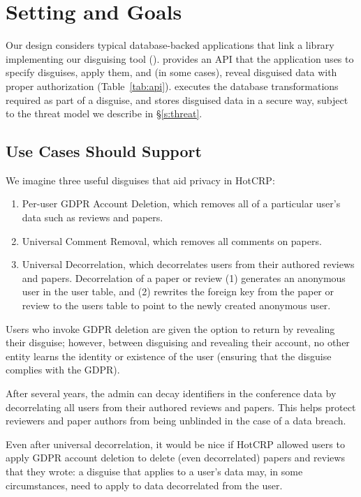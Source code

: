 \section{Setting and Goals}
Our design considers typical database-backed applications that link a library implementing our disguising
tool (\sys).
%
\sys provides an API that the application uses to specify disguises, apply them, and (in some
cases), reveal disguised data with proper authorization (Table~\ref{tab:api}).
%
\sys executes the database transformations required as part of a disguise, and stores
disguised data in a secure way, subject to the threat model we describe in \S\ref{s:threat}.

\subsection{Use Cases \sys Should Support}

We imagine three useful disguises that aid privacy in HotCRP: 
\begin{enumerate}
    \item Per-user GDPR Account Deletion, which
        removes all of a particular user's data such as reviews and papers.
    \item Universal Comment Removal, which removes all comments on papers.
    \item Universal Decorrelation, which decorrelates users from
        their authored reviews and papers. Decorrelation of a paper or review (1) generates an
        anonymous user in the user table, and (2) rewrites the foreign key from the paper or review
        to the users table to point to the newly created anonymous user.
\end{enumerate}

Users who invoke GDPR deletion are given the option to return by revealing their disguise; however,
between disguising and revealing their account, no other entity learns the identity or existence of
the user (ensuring that the disguise complies with the GDPR).

After several years, the admin can decay identifiers in the conference data by decorrelating all
users from their authored reviews and papers.  This helps protect reviewers and paper authors from
being unblinded in the case of a data breach.

Even after universal decorrelation, it would be nice if HotCRP allowed users to apply GDPR account
deletion to delete (even decorrelated) papers and reviews that they wrote: a disguise that applies
to a user's data may, in some circumstances, need to apply to data decorrelated from the user.

